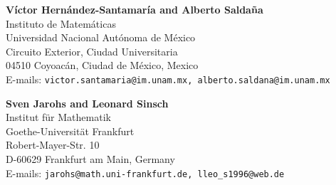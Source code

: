\documentclass[10 pt]{article}
\numberwithin{equation}{section}
\begin{document}
\bigskip
\begin{flushleft}
\textbf{Víctor Hernández-Santamaría and Alberto Saldaña}\\
Instituto de Matemáticas\\
Universidad Nacional Autónoma de México\\
Circuito Exterior, Ciudad Universitaria\\
04510 Coyoacán, Ciudad de México, Mexico\\
E-mails: \texttt{victor.santamaria@im.unam.mx, alberto.saldana@im.unam.mx} 
\vspace{.3cm}
\end{flushleft}

\begin{flushleft}
\textbf{Sven Jarohs and Leonard Sinsch}\\
Institut f\"ur Mathematik\\
Goethe-Universit\"at Frankfurt\\
Robert-Mayer-Str. 10\\
D-60629 Frankfurt am Main, Germany  \\
E-mails: \texttt{jarohs@math.uni-frankfurt.de, lleo\_s1996@web.de} 
\vspace{.3cm}
\end{flushleft}
\end{document}
